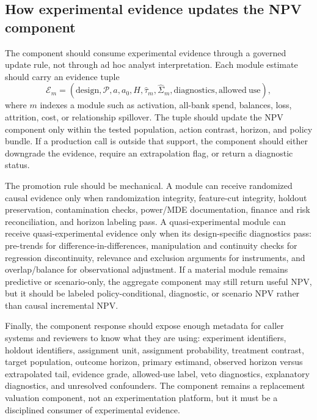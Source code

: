 \documentclass[11pt]{article}
\newcommand{\1}{\mathbf{1}}
\begin{document}
\subsection{How experimental evidence updates the NPV component}

The component should consume experimental evidence through a governed update
rule, not through ad hoc analyst interpretation. Each module estimate should
carry an evidence tuple
\begin{equation}
  \mathcal{E}_{m}
  =
  (\mathrm{design},\mathcal{P},a,a_0,H,\widehat{\tau}_m,
   \widehat{\Sigma}_m,\mathrm{diagnostics},\mathrm{allowed\ use}),
  \label{eq:evidence-tuple}
\end{equation}
where $m$ indexes a module such as activation, all-bank spend, balances, loss,
attrition, cost, or relationship spillover. The tuple should update the NPV
component only within the tested population, action contrast, horizon, and
policy bundle. If a production call is outside that support, the component
should either downgrade the evidence, require an extrapolation flag, or return
a diagnostic status.

The promotion rule should be mechanical. A module can receive randomized
causal evidence only when randomization integrity, feature-cut integrity,
holdout preservation, contamination checks, power/MDE documentation, finance
and risk reconciliation, and horizon labeling pass. A quasi-experimental
module can receive quasi-experimental evidence only when its design-specific
diagnostics pass: pre-trends for difference-in-differences, manipulation and
continuity checks for regression discontinuity, relevance and exclusion
arguments for instruments, and overlap/balance for observational adjustment.
If a material module remains predictive or scenario-only, the aggregate
component may still return useful NPV, but it should be labeled
policy-conditional, diagnostic, or scenario NPV rather than causal incremental
NPV.

Finally, the component response should expose enough metadata for caller
systems and reviewers to know what they are using: experiment identifiers,
holdout identifiers, assignment unit, assignment probability, treatment
contrast, target population, outcome horizon, primary estimand, observed
horizon versus extrapolated tail, evidence grade, allowed-use label, veto
diagnostics, explanatory diagnostics, and unresolved confounders. The
component remains a replacement valuation component, not an experimentation
platform, but it must be a disciplined consumer of experimental evidence.
\end{document}
